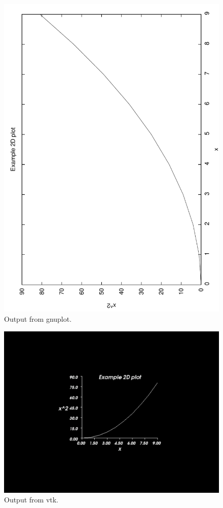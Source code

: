 \begin{figure}
\centerline{%
\includegraphics[width=\figwidth,angle=-90]{figures/plotExampleGnuplot}%
}
\caption{Output from gnuplot.}
\end{figure}
\fi

\begin{figure}
\centerline{%
\includegraphics[width=\figwidth]{figures/plotExampleVTK}%
}
\caption{Output from vtk.}
\end{figure}


